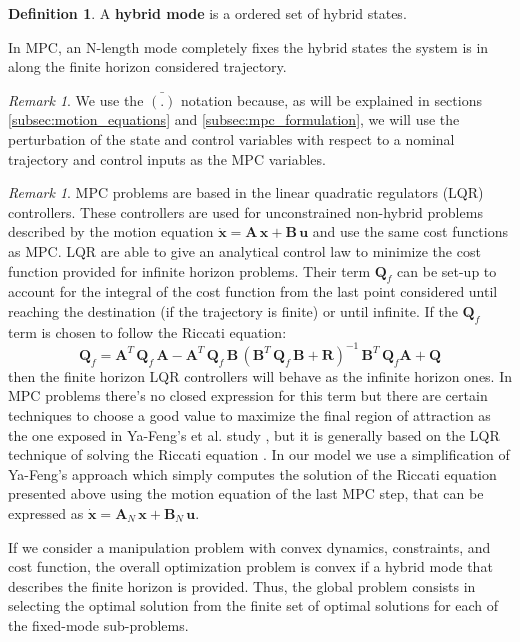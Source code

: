 \documentclass[12,twoside]{TFG-GM}
\theoremstyle{definition}
\newtheorem{definition}[theorem]{Definition}
\theoremstyle{remark}
\newtheorem{remark}[theorem]{Remark}
\newcommand*\diff[1]{\bar{#1}}
\begin{document}
\begin{definition} \label{def:mode} A \textbf{hybrid mode} is a ordered set of hybrid states.

In MPC, an N-length mode completely fixes the hybrid states the system is in along the finite horizon considered trajectory.
\end{definition}


\begin{remark}
We use the $\diff{(.)}$ notation because, as will be explained in sections \ref{subsec:motion_equations} and \ref{subsec:mpc_formulation}, we will use the perturbation of the state and control variables with respect to a nominal trajectory and control inputs as the MPC variables.
\end{remark}
\begin{remark}
MPC problems are based in the linear quadratic regulators (LQR) controllers. These controllers are used for unconstrained non-hybrid problems described by the motion equation $\dot{\textbf{x}} = \textbf{A} \, \textbf{x} + \textbf{B} \, \textbf{u}$ and use the same cost functions as MPC. LQR are able to give an analytical control law to minimize the cost function provided for infinite horizon problems. Their term $\textbf{Q}_f$ can be set-up to account for the integral of the cost function from the last point considered until reaching the destination (if the trajectory is finite) or until infinite. If the $\textbf{Q}_f$ term is chosen to follow the Riccati equation: $$\textbf{Q}_f = \textbf{A}^T \, \textbf{Q}_f \, \textbf{A} - \textbf{A}^T \, \textbf{Q}_f \, \textbf{B} \,(\textbf{B}^T\, \textbf{Q}_f \,\textbf{B} + \textbf{R})^{-1} \, \textbf{B}^T \, \textbf{Q}_f \textbf{A} + \textbf{Q}$$ then the finite horizon LQR controllers will behave as the infinite horizon ones. In MPC problems there's no closed expression for this term but there are certain techniques to choose a good value to maximize the final region of attraction as the one exposed in Ya-Feng's et al. study \cite{riccati}, but it is generally based on the LQR technique of solving the Riccati equation . In our model we use a simplification of Ya-Feng's approach which simply computes the solution of the Riccati equation presented above using the motion equation of the last MPC step, that can be expressed as $\dot{\textbf{x}} = \textbf{A}_N \, \textbf{x} + \textbf{B}_N \, \textbf{u}$.
\end{remark}

If we consider a manipulation problem with convex dynamics, constraints, and cost function, the overall optimization problem is convex if a hybrid mode that describes the finite horizon is provided. Thus, the global problem consists in selecting the optimal solution from the finite set of optimal solutions for each of the fixed-mode sub-problems.
\end{document}
